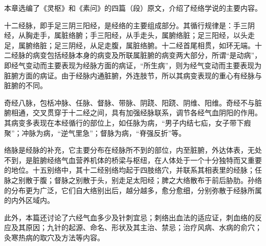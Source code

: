 \documentclass[12pt]{ctexbook}%
\begin{document}
\xiaojie

本章选编了《灵枢》和《素问》的四篇（段）原文，介绍了经络学说的主要内容。

十二经脉，即手足三阴三阳经，是经络的主要组成部分。其循行规律是：手三阴经，从胸走手，属脏络腑；手三阳经，从手走头，属腑络脏；足三阳经，以头走足，属腑络脏；足三阴经，从足走腹，属脏络腑。十二经首尾相贯，如环无端。十二经脉的病变包括经脉本身的病变及所联属脏腑的病变两大部分，所谓“是动病”，即经气变动而主要表现为经脉方面的病证，“所生病”，则为经气变动而主要表现为脏腑方面的病证。由于经脉内通脏腑，外连肢节，所以其病变表现的重心有经脉与脏腑的不同。

奇经八脉，包栝冲脉、任脉、督脉、带脉、阴跷、阳跷、阴维、阳维。奇经不与脏腑相通，交叉贯穿于十二经之间，具有加强经脉联系，调节各经气血阴阳的作用。其病变多表现在本经循行的部位上，如任脉为病，“男子内结七疝，女子带下瘕聚”；冲脉为病，“逆气里急”；督脉为病，“脊强反折”等。

络脉是经脉的补充，它主要分布在经脉所不到的部位，内至脏腑，外达体表，无处不到，是脏腑经络气血营养机体的桥梁与枢纽，在人体处于一个十分独特而又重要的地位。十五别络中，其十二经别络均起于四肢络穴，并联系其相表里的经脉；任脉之别散于腹；督脉之别散于头，别走足太阳经；脾之大络散布于前后胁肋。孙络的分布更为广泛，它们自大络别出后，越分越多，愈分愈细，分别弥散于经脉所属的内外区域内。

此外，本篇还讨论了六经气血多少及针刺宜忌；刺络出血法的适应证，刺血络的反应及其原因；九针的起源、命名、形状及其主治、禁忌；治疗风病、水病的俞穴；灸寒热病的取穴及方法等内容。

\ifx \allfiles \undefined
\end{document}
